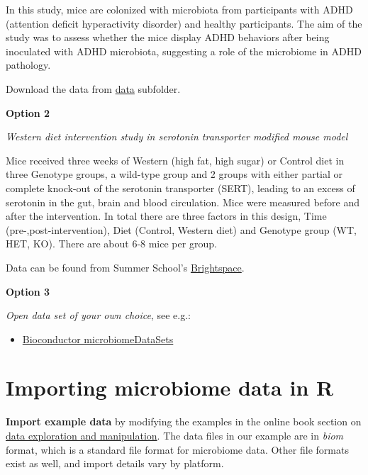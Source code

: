 \documentclass[
  oneside]{book}
\providecommand{\tightlist}{%
  \setlength{\itemsep}{0pt}\setlength{\parskip}{0pt}}
\begin{document}
In this study, mice are colonized with microbiota from participants
with ADHD (attention deficit hyperactivity disorder) and healthy
participants. The aim of the study was to assess whether the mice
display ADHD behaviors after being inoculated with ADHD microbiota,
suggesting a role of the microbiome in ADHD pathology.

Download the data from
\href{https://github.com/microbiome/course_2021_radboud/tree/main/data}{data}
subfolder.

\textbf{Option 2}

\emph{Western diet intervention study in serotonin transporter modified mouse model}

Mice received three weeks of Western (high fat, high sugar) or Control diet in
three Genotype groups, a wild-type group and 2 groups with either partial or
complete knock-out of the serotonin transporter (SERT), leading to an excess of
serotonin in the gut, brain and blood circulation. Mice were measured before
and after the intervention. In total there are three factors in this design,
Time (pre-,post-intervention), Diet (Control, Western diet) and Genotype group
(WT, HET, KO). There are about 6-8 mice per group.

Data can be found from Summer School's \href{https://brightspace.ru.nl/d2l/le/content/249077/Home}{Brightspace}.

\textbf{Option 3}

\emph{Open data set of your own choice}, see e.g.:

\begin{itemize}
\tightlist
\item
  \href{https://bioconductor.org/packages/release/data/experiment/html/microbiomeDataSets.html}{Bioconductor microbiomeDataSets}
\end{itemize}

\hypertarget{importing-microbiome-data-in-r}{%
\section{Importing microbiome data in R}\label{importing-microbiome-data-in-r}}

\textbf{Import example data} by modifying the examples in the online book
section on \href{https://microbiome.github.io/OMA/data-introduction.html\#loading-experimental-microbiome-data}{data exploration and
manipulation}. The
data files in our example are in \emph{biom} format, which is a standard
file format for microbiome data. Other file formats exist as well, and
import details vary by platform.
\end{document}
